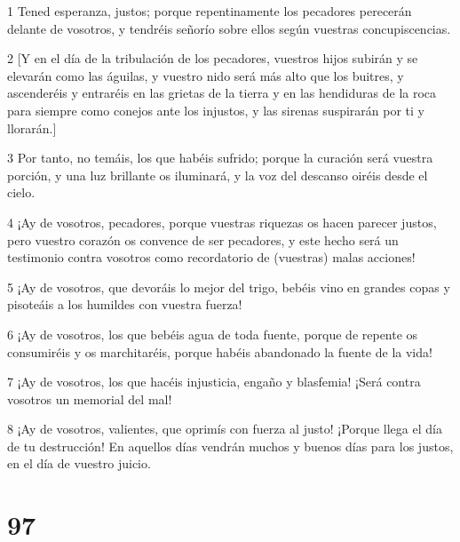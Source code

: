 \par 1 Tened esperanza, justos; porque repentinamente los pecadores perecerán delante de vosotros, y tendréis señorío sobre ellos según vuestras concupiscencias.
\par 2 [Y en el día de la tribulación de los pecadores, vuestros hijos subirán y se elevarán como las águilas, y vuestro nido será más alto que los buitres, y ascenderéis y entraréis en las grietas de la tierra y en las hendiduras de la roca para siempre como conejos ante los injustos, y las sirenas suspirarán por ti y llorarán.]
\par 3 Por tanto, no temáis, los que habéis sufrido; porque la curación será vuestra porción, y una luz brillante os iluminará, y la voz del descanso oiréis desde el cielo.
\par 4 ¡Ay de vosotros, pecadores, porque vuestras riquezas os hacen parecer justos, pero vuestro corazón os convence de ser pecadores, y este hecho será un testimonio contra vosotros como recordatorio de (vuestras) malas acciones!
\par 5 ¡Ay de vosotros, que devoráis lo mejor del trigo, bebéis vino en grandes copas y pisoteáis a los humildes con vuestra fuerza!
\par 6 ¡Ay de vosotros, los que bebéis agua de toda fuente, porque de repente os consumiréis y os marchitaréis, porque habéis abandonado la fuente de la vida!
\par 7 ¡Ay de vosotros, los que hacéis injusticia, engaño y blasfemia! ¡Será contra vosotros un memorial del mal!
\par 8 ¡Ay de vosotros, valientes, que oprimís con fuerza al justo! ¡Porque llega el día de tu destrucción! En aquellos días vendrán muchos y buenos días para los justos, en el día de vuestro juicio.

\chapter{97}

